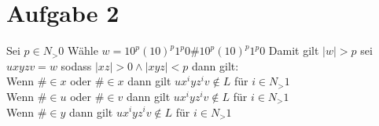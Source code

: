 \section*{Aufgabe 2}

Sei $ p\in N_>0 $ Wähle $ w= 10^p(10)^p1^p0\#10^p(10)^p1^p0 $ Damit gilt $|w|>p$ sei $uxyzv=w$ sodass $|xz|>0 \wedge |xyz|<p$ dann gilt: \\
Wenn $\# \in x$ oder $ \# \in x$ dann gilt 
$ux^iyz^iv \not\in L$ für $i \in N_>1$ \\
Wenn $\# \in u$ oder $ \# \in v$ dann gilt 
$ux^iyz^iv \not\in L$ für $i \in N_>1$\\
Wenn $\# \in y$  dann gilt 
$ux^iyz^iv \not\in L$ für $i \in N_>1$\\
